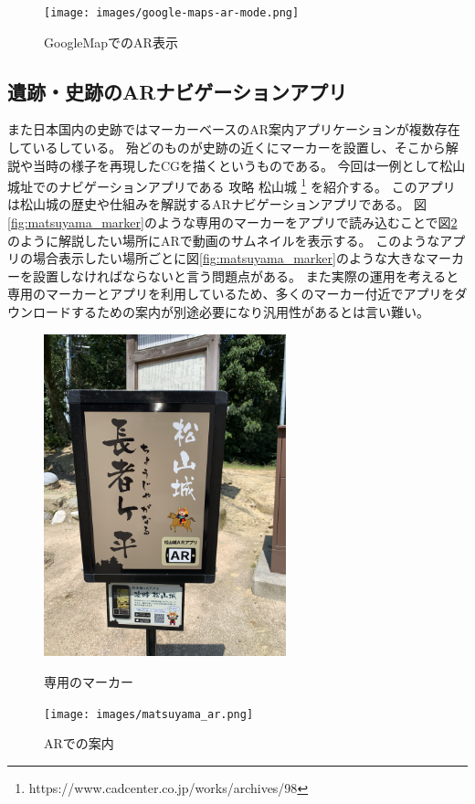 \begin{figure}[h]
  \begin{center}
      \texttt{[image: images/google-maps-ar-mode.png]}
  \end{center}
  \caption{GoogleMapでのAR表示} \label{fig:googleMapAr}
\end{figure}

\subsection{遺跡・史跡のARナビゲーションアプリ}
また日本国内の史跡ではマーカーベースのAR案内アプリケーションが複数存在しているしている。
殆どのものが史跡の近くにマーカーを設置し、そこから解説や当時の様子を再現したCGを描くというものである。
今回は一例として松山城址でのナビゲーションアプリである 攻略 松山城 \footnote{\textsf{https://www.cadcenter.co.jp/works/archives/98}} を紹介する。
このアプリは松山城の歴史や仕組みを解説するARナビゲーションアプリである。
図\ref{fig:matsuyama_marker}のような専用のマーカーをアプリで読み込むことで図\ref{fig:matsuyama_ar}のように解説したい場所にARで動画のサムネイルを表示する。
このようなアプリの場合表示したい場所ごとに図\ref{fig:matsuyama_marker}のような大きなマーカーを設置しなければならないと言う問題点がある。
また実際の運用を考えると専用のマーカーとアプリを利用しているため、多くのマーカー付近でアプリをダウンロードするための案内が別途必要になり汎用性があるとは言い難い。


\begin{figure}[h]
  \begin{minipage}{0.5\hsize}
    \centering
    \includegraphics[width=70mm]{images/matsuyama_marker.jpg}
    \caption{専用のマーカー} \label{fig:matsuyama_marker}
  \end{minipage}
  \begin{minipage}{0.5\hsize}
    \centering
    \texttt{[image: images/matsuyama\_ar.png]}
    \caption{ARでの案内} \label{fig:matsuyama_ar}
  \end{minipage}
\end{figure}


